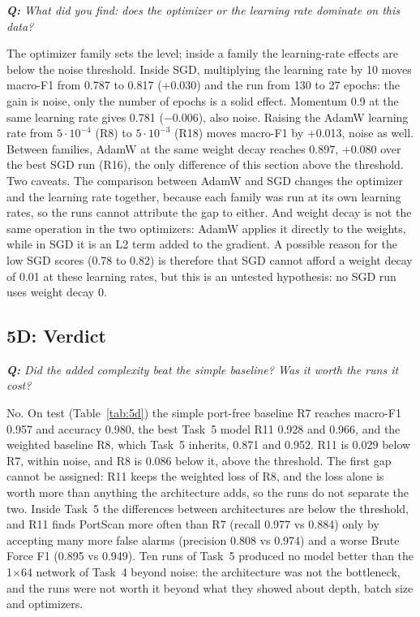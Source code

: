 \documentclass[9pt]{extarticle}
\newcommand{\qa}[1]{\par\vspace{2pt}\noindent\textit{\textbf{Q:} #1}\par\nopagebreak\noindent}
\newcommand{\run}[1]{\textsf{#1}}   %
\begin{document}
\qa{What did you find: does the optimizer or the learning rate dominate on this data?}
The optimizer family sets the level; inside a family the learning-rate effects are below the noise
threshold. Inside SGD, multiplying the learning rate by 10 moves macro-F1 from 0.787 to 0.817
(+0.030) and the run from 130 to 27 epochs: the gain is noise, only the number of epochs is a solid
effect. Momentum 0.9 at the same learning rate gives 0.781 ($-$0.006), also noise. Raising the AdamW
learning rate from $5\cdot10^{-4}$ (\run{R8}) to $5\cdot10^{-3}$ (\run{R18}) moves macro-F1 by +0.013,
noise as well. Between families, AdamW at the same weight decay reaches 0.897, +0.080 over the best
SGD run (\run{R16}), the only difference of this section above the threshold. Two caveats. The
comparison between AdamW and SGD changes the optimizer and the learning rate together, because each
family was run at its own learning rates, so the runs cannot attribute the gap to either. And weight
decay is not the same operation in the two optimizers: AdamW applies it directly to the weights,
while in SGD it is an L2 term added to the gradient. A possible reason for the low SGD scores (0.78 to
0.82) is therefore that SGD cannot afford a weight decay of 0.01 at these learning rates, but this is
an untested hypothesis: no SGD run uses weight decay 0.

\subsection{5D: Verdict}
\qa{Did the added complexity beat the simple baseline? Was it worth the runs it cost?}
No. On test (Table~\ref{tab:5d}) the simple port-free baseline \run{R7} reaches macro-F1 0.957 and
accuracy 0.980, the best Task~5 model \run{R11} 0.928 and 0.966, and the weighted baseline \run{R8},
which Task~5 inherits, 0.871 and 0.952. \run{R11} is 0.029 below \run{R7}, within noise, and \run{R8}
is 0.086 below it, above the threshold. The first gap cannot be assigned: \run{R11} keeps the weighted
loss of \run{R8}, and the loss alone is worth more than anything the architecture adds, so the runs do
not separate the two. Inside Task~5 the differences between architectures are below the threshold, and
\run{R11} finds PortScan more often than \run{R7} (recall 0.977 vs 0.884) only by accepting many more
false alarms (precision 0.808 vs 0.974) and a worse Brute Force F1 (0.895 vs 0.949). Ten runs of
Task~5 produced no model better than the 1$\times$64 network of Task~4 beyond noise: the architecture
was not the bottleneck, and the runs were not worth it beyond what they showed about depth, batch
size and optimizers.
\end{document}
